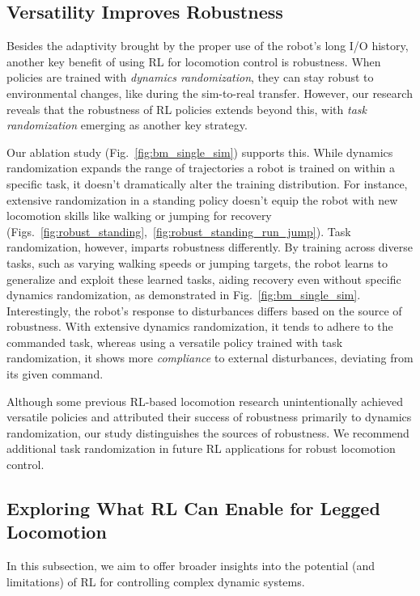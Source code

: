 \subsection{Versatility Improves Robustness}\label{subsec:diss_robustness}
Besides the adaptivity brought by the proper use of the robot's long I/O history, another key benefit of using RL for locomotion control is robustness. 
When policies are trained with \emph{dynamics randomization}, they can stay robust to environmental changes, like during the sim-to-real transfer. 
However, our research reveals that the robustness of RL policies extends beyond this, with \emph{task randomization} emerging as another key strategy.

Our ablation study (Fig.~\ref{fig:bm_single_sim}) supports this. 
While dynamics randomization expands the range of trajectories a robot is trained on within a specific task, it doesn't dramatically alter the training distribution. 
For instance, extensive randomization in a standing policy doesn't equip the robot with new locomotion skills like walking or jumping for recovery (Figs.~\ref{fig:robust_standing},~\ref{fig:robust_standing_run_jump}). 
Task randomization, however, imparts robustness differently. 
By training across diverse tasks, such as varying walking speeds or jumping targets, the robot learns to generalize and exploit these learned tasks, aiding recovery even without specific dynamics randomization, as demonstrated in Fig.~\ref{fig:bm_single_sim}.
Interestingly, the robot's response to disturbances differs based on the source of robustness. 
With extensive dynamics randomization, it tends to adhere to the commanded task, whereas using a versatile policy trained with task randomization, it shows more \emph{compliance} to external disturbances, deviating from its given command.

Although some previous RL-based locomotion research unintentionally achieved versatile policies and attributed their success of robustness primarily to dynamics randomization, our study distinguishes the sources of robustness. 
We recommend additional task randomization in future RL applications for robust locomotion control.





\subsection{Exploring What RL Can Enable for Legged Locomotion}\label{subsec:diss_general}
In this subsection, we aim to offer broader insights into the potential (and limitations) of RL for controlling complex dynamic systems. 


